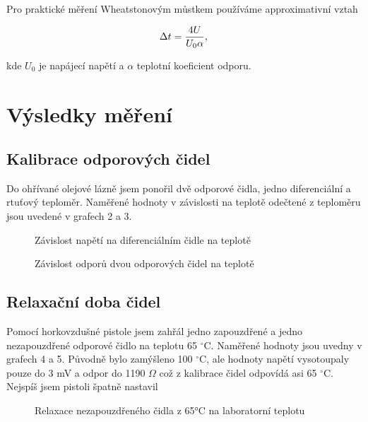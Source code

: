 \documentclass[a4paper,11pt]{article}
\begin{document}
Pro praktické měření Wheatstonovým můstkem používáme approximativní vztah

\begin{equation}
\Delta t = \frac{4U}{U_0 \alpha}, \\
\end{equation}

kde $U_0$ je napájecí napětí a $\alpha$ teplotní koeficient odporu.

\newpage

\section{Výsledky měření}

\subsection{Kalibrace odporových čidel}

Do ohřívané olejové lázně jsem ponořil dvě odporové čidla, jedno diferenciální a rtuťový teploměr. Naměřené hodnoty v závislosti na teplotě odečtené z teploměru jsou uvedené v grafech 2 a 3.

\begin{figure}[ht]
  \centering
  
  \caption{Závislost napětí na diferenciálním čidle na teplotě}
\end{figure}

\begin{figure}[ht]
  \centering
  
  \caption{Závislost odporů dvou odporových čidel na teplotě}
\end{figure}

\subsection{Relaxační doba čidel}

Pomocí horkovzdušné pistole jsem zahřál jedno zapouzdřené a jedno nezapouzdřené odporové čidlo na teplotu 65 $^{\circ}$C. Naměřené hodnoty jsou uvedny v grafech 4 a 5. Původně bylo zamýšleno 100 $^{\circ}$C, ale hodnoty napětí vysotoupaly pouze do 3 mV a odpor do 1190 $\Omega$ což z kalibrace čidel odpovídá asi 65 $^{\circ}$C. Nejspíš jsem pistoli špatně nastavil

\begin{figure}[ht]
  \centering
  
  \caption{Relaxace nezapouzdřeného čidla z 65°C na laboratorní teplotu}
\end{figure}
\end{document}
